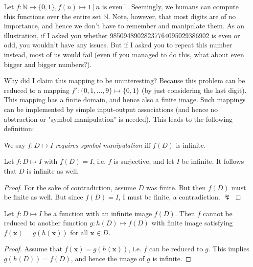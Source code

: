 \documentclass[../../main.tex]{subfiles}
\begin{document}
    \begin{example}
        \label{example:even_odd}
        Let $f: \mathbb{N} \mapsto \{0, 1\}, f(n) \mapsto 1[n \text{ is even}]$. Seemingly, we humans can compute this functions over the entire set $\mathbb{N}$. Note, however, that most digits are of no importance, and hence we don't have to remember and manipulate them. As an illustration, if I asked you whether 98509489028237764095029386902 is even or odd, you wouldn't have any issues. But if I asked you to repeat this number instead, most of us would fail (even if you managed to do this, what about even bigger and bigger numbers?).
    \end{example}

    Why did I claim this mapping to be uninteresting? Because this problem can be reduced to a mapping $f': \{0, 1, \dots, 9\} \mapsto \{0, 1\}$ (by just considering the last digit). This mapping has a finite domain, and hence also a finite image. Such mappings can be implemented by simple input-output associations (and hence no abstraction or "symbol manipulation" is needed). This leads to the following definition:

    \begin{definition}
        We say $f: D \mapsto I $ \emph{requires symbol manipulation} iff $f(D)$ is infinite.
    \end{definition}

    \begin{proposition}
        Let $f: D \mapsto I$ with $f(D) = I$, i.e. $f$ is surjective, and let $I$ be infinite. It follows that $D$ is infinite as well.
    \end{proposition}
    \vspace{-2.5em}
    \begin{proof}
        For the sake of contradiction, assume $D$ was finite. But then $f(D)$ must be finite as well. But since $f(D) = I$, I must be finite, a contradiction. $\lightning$
    \end{proof}

    \begin{lemma}
        Let $f: D \mapsto I$ be a function with an infinite image $f(D)$. Then $f$ cannot be reduced to another function $g: h(D) \mapsto f(D)$ with finite image satisfying $f(\bm{x}) = g(h(\bm{x}))$ for all $\bm{x} \in D$.
    \end{lemma}
    \vspace{-2.5em}
    \begin{proof}
        Assume that $f(\bm{x}) = g(h(\bm{x}))$, i.e. $f$ can be reduced to $g$. This implies $g(h(D)) = f(D)$, and hence the image of $g$ is infinite.
    \end{proof}
\end{document}
